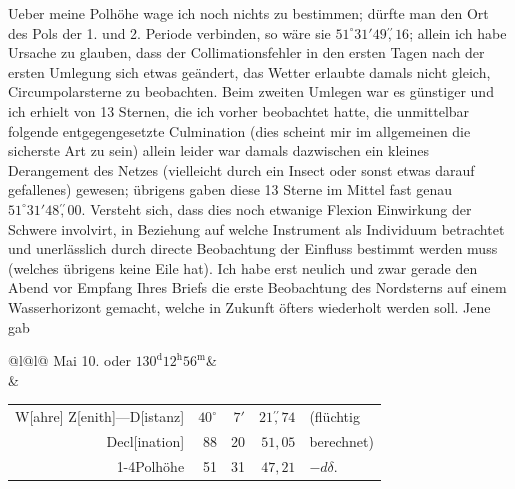 \noindent\hspace*{\parindent}Ueber meine Polhöhe wage ich noch nichts zu bestimmen; dürfte man den Ort des Pols der 1. und 2. Periode verbinden, so wäre sie \(51^\circ31'49\overset{\prime\prime}{,}16\); allein ich habe Ursache zu glauben, dass der Collimationsfehler in den ersten Tagen nach der ersten Umlegung sich etwas geändert, das Wetter erlaubte damals nicht gleich, Circumpolarsterne zu beobachten. Beim zweiten Umlegen war es günstiger und ich erhielt von 13 Sternen, die ich vorher beobachtet hatte, die unmittelbar folgende entgegengesetzte Culmination (dies scheint mir im allgemeinen die sicherste Art zu sein) allein leider war damals dazwischen ein kleines Derangement des Netzes (vielleicht durch ein Insect oder sonst etwas darauf gefallenes) gewesen; übrigens gaben diese 13 Sterne
\clearpage{}
\noindent im Mittel fast genau \(51^\circ31'48\overset{\prime\prime}{,}00\). Versteht sich, dass dies noch etwanige Flexion  Einwirkung der Schwere involvirt, in Beziehung auf welche  Instrument als Individuum betrachtet und unerlässlich durch directe Beobachtung der Einfluss bestimmt werden muss (welches übrigens keine Eile hat). Ich habe erst neulich und zwar gerade den Abend vor Empfang Ihres Briefs die erste Beobachtung des Nordsterns auf einem Wasserhorizont gemacht, welche in Zukunft öfters wiederholt werden soll. Jene gab
\begin{center}\begingroup\fontsize{8.5}{11}\selectfont\setlength{\tabcolsep}{2pt}
\begin{tabular}{@{}l@{\quad}l@{}}
Mai 10. oder \(130^{\mathrm{d}}12^{\mathrm{h}}56^{\mathrm{m}}\)&\\
&\begin{tabular}{@{}rrrrl@{}}W[ahre] Z[enith]—D[istanz]&\(40^\circ\)&\(7'\)&\(21\overset{\prime\prime}{,}74\)&(flüchtig\\Decl[ination]&88&20&\(51{,}05\)&berechnet)\\\cline{1-4}Polhöhe&51&31&\(47{,}21\)&\(-d\delta.\)\end{tabular}
\end{tabular}\par\endgroup\end{center}

